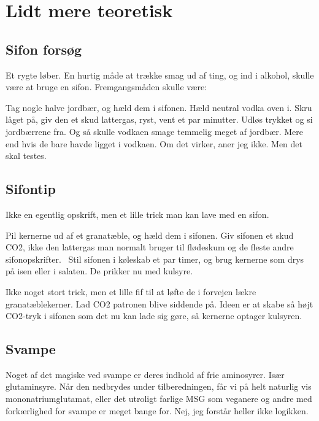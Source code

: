 \documentclass[
]{book}
\begin{document}
\hypertarget{lidt-mere-teoretisk}{%
\chapter{Lidt mere teoretisk}\label{lidt-mere-teoretisk}}

\hypertarget{sifon-forsuxf8g}{%
\section{Sifon forsøg}\label{sifon-forsuxf8g}}

Et rygte løber. En hurtig måde at trække smag ud af ting, og ind i alkohol, skulle være at bruge en sifon. Fremgangsmåden skulle være:

Tag nogle halve jordbær, og hæld dem i sifonen. Hæld neutral vodka oven i. Skru låget på, giv den et skud lattergas, ryst, vent et par minutter. Udløs trykket og si jordbærrene fra. Og så skulle vodkaen smage temmelig meget af jordbær. Mere end hvis de bare havde ligget i vodkaen. Om det virker, aner jeg ikke. Men det skal testes.

\hypertarget{sifontip}{%
\section{Sifontip}\label{sifontip}}

Ikke en egentlig opskrift, men et lille trick man kan lave med en sifon.

Pil kernerne ud af et granatæble, og hæld dem i sifonen. Giv sifonen et skud CO2, ikke den lattergas man normalt bruger til flødeskum og de fleste andre sifonopskrifter.~
Stil sifonen i køleskab et par timer, og brug kernerne som drys på isen eller i salaten. De prikker nu med kulsyre.

Ikke noget stort trick, men et lille fif til at løfte de i forvejen lækre granatæblekerner. Lad CO2 patronen blive siddende på. Ideen er at skabe så højt CO2-tryk i sifonen som det nu kan lade sig gøre, så kernerne optager kulsyren.

\hypertarget{svampe}{%
\section{Svampe}\label{svampe}}

Noget af det magiske ved svampe er deres indhold af frie aminosyrer. Især
glutaminsyre. Når den nedbrydes under tilberedningen, får vi på helt naturlig
vis mononatriumglutamat, eller det utroligt farlige MSG som veganere og andre
med forkærlighed for svampe er meget bange for. Nej, jeg forstår heller ikke
logikken.
\end{document}

